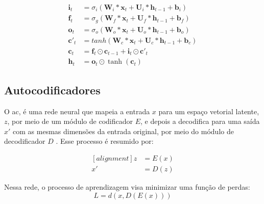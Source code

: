 \begin{equation}
\label{eq:conlstm}
\begin{aligned}
\textbf{i}_t &= \sigma_{i}(\textbf{W}_i*\textbf{x}_t + \textbf{U}_i*\textbf{h}_{t-1} + \textbf{b}_i) \\
\textbf{f}_t &= \sigma_{g}(\textbf{W}_f*\textbf{x}_t + \textbf{U}_f*\textbf{h}_{t-1} + \textbf{b}_f) \\
\textbf{o}_t &= \sigma_{o}(\textbf{W}_o*\textbf{x}_t + \textbf{U}_o*\textbf{h}_{t-1} + \textbf{b}_o) \\   
\textbf{c}'_t &= tanh(\textbf{W}_c*\textbf{x}_t + \textbf{U}_c*\textbf{h}_{t-1} + \textbf{b}_c) \\
\textbf{c}_t &= \textbf{f}_t \odot \textbf{c}_{t-1} + \textbf{i}_t \odot \textbf{c}'_t \\
\textbf{h}_t & = \textbf{o}_t \odot \tanh(\textbf{c}_t)  
\end{aligned}
\end{equation}


\subsection{Autocodificadores}


O \gls{ac}, é uma rede neural que mapeia a entrada $x$ para um espaço vetorial latente, $z$, por meio de um módulo de codificador $E$, e depois a decodifica para uma saída $x'$ com as mesmas dimensões da entrada original, por meio do módulo de decodificador $D$ \cite{FrancoisDeepLearning}. Esse processo é resumido por: 

\begin{equation}
\begin{aligned}[alignment]
z &= E(x)\\ 
x' &= D(z)	
\end{aligned}
\end{equation}

Nessa rede, o processo de aprendizagem visa minimizar uma função de perdas:
\begin{equation}
L = d(x,D(E(x)))
\end{equation}

